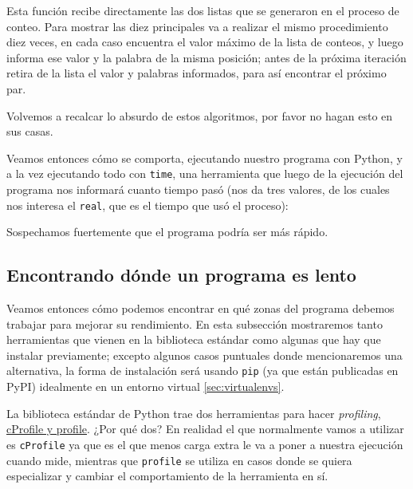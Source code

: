 
Esta función recibe directamente las dos listas que se generaron en el proceso de conteo. Para mostrar las diez principales va a realizar el mismo procedimiento diez veces, en cada caso encuentra el valor máximo de la lista de conteos, y luego informa ese valor y la palabra de la misma posición; antes de la próxima iteración retira de la lista el valor y palabras informados, para así encontrar el próximo par.

Volvemos a recalcar lo absurdo de estos algoritmos, por favor no hagan esto en sus casas.

Veamos entonces cómo se comporta, ejecutando nuestro programa con Python, y a la vez ejecutando todo con \texttt{time}, una herramienta que luego de la ejecución del programa nos informará cuanto tiempo pasó (nos da tres valores, de los cuales nos interesa el \texttt{real}, que es el tiempo que usó el proceso):


Sospechamos fuertemente que el programa podría ser más rápido.


\subsection{Encontrando dónde un programa es lento}

Veamos entonces cómo podemos encontrar en qué zonas del programa debemos trabajar para mejorar su rendimiento. En esta subsección mostraremos tanto herramientas que vienen en la biblioteca estándar como algunas que hay que instalar previamente; excepto algunos casos puntuales donde mencionaremos una alternativa, la forma de instalación será usando \texttt{pip} (ya que están publicadas en PyPI) idealmente en un entorno virtual \ref{sec:virtualenvs}.

La biblioteca estándar de Python trae dos herramientas para hacer \textit{profiling}, \href{https://docs.python.org/es/dev/library/profile.html#the-python-profilers}{cProfile y profile}. ¿Por qué dos? En realidad el que normalmente vamos a utilizar es \texttt{cProfile} ya que es el que menos carga extra le va a poner a nuestra ejecución cuando mide, mientras que \texttt{profile} se utiliza en casos donde se quiera especializar y cambiar el comportamiento de la herramienta en sí.

